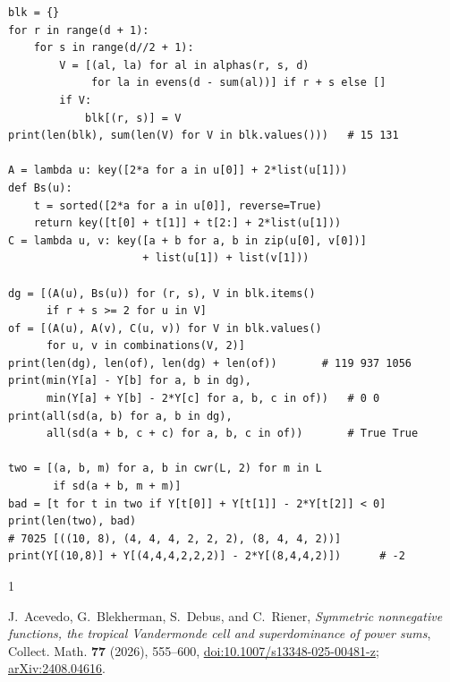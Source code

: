 \documentclass[11pt]{amsart}
\begin{document}
{\begin{verbatim}
blk = {}
for r in range(d + 1):
    for s in range(d//2 + 1):
        V = [(al, la) for al in alphas(r, s, d)
             for la in evens(d - sum(al))] if r + s else []
        if V:
            blk[(r, s)] = V
print(len(blk), sum(len(V) for V in blk.values()))   # 15 131

A = lambda u: key([2*a for a in u[0]] + 2*list(u[1]))
def Bs(u):
    t = sorted([2*a for a in u[0]], reverse=True)
    return key([t[0] + t[1]] + t[2:] + 2*list(u[1]))
C = lambda u, v: key([a + b for a, b in zip(u[0], v[0])]
                     + list(u[1]) + list(v[1]))

dg = [(A(u), Bs(u)) for (r, s), V in blk.items()
      if r + s >= 2 for u in V]
of = [(A(u), A(v), C(u, v)) for V in blk.values()
      for u, v in combinations(V, 2)]
print(len(dg), len(of), len(dg) + len(of))       # 119 937 1056
print(min(Y[a] - Y[b] for a, b in dg),
      min(Y[a] + Y[b] - 2*Y[c] for a, b, c in of))   # 0 0
print(all(sd(a, b) for a, b in dg),
      all(sd(a + b, c + c) for a, b, c in of))       # True True

two = [(a, b, m) for a, b in cwr(L, 2) for m in L
       if sd(a + b, m + m)]
bad = [t for t in two if Y[t[0]] + Y[t[1]] - 2*Y[t[2]] < 0]
print(len(two), bad)
# 7025 [((10, 8), (4, 4, 4, 2, 2, 2), (8, 4, 4, 2))]
print(Y[(10,8)] + Y[(4,4,4,2,2,2)] - 2*Y[(8,4,4,2)])      # -2
\end{verbatim}
}

\begin{thebibliography}{1}

J.~Acevedo, G.~Blekherman, S.~Debus, and C.~Riener,
\emph{Symmetric nonnegative functions, the tropical Vandermonde
cell and superdominance of power sums},
Collect. Math. \textbf{77} (2026), 555--600,
\href{https://doi.org/10.1007/s13348-025-00481-z}
{doi:10.1007/s13348-025-00481-z};
\href{https://arxiv.org/abs/2408.04616}{arXiv:2408.04616}.

\end{thebibliography}
\end{document}
